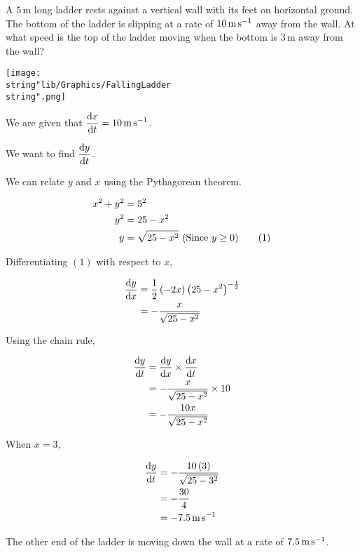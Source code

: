 \documentclass[11pt,a4paper]{book}
\begin{document}
\begin{example}

\begin{minipage}[t]{0.6\textwidth}

A $5\,\text{m}$ long ladder rests against a vertical wall with its
feet on horizontal ground. The bottom of the ladder is slipping at
a rate of $10\,\text{m\,s}^{-1}$ away from the wall. At what speed
is the top of the ladder moving when the bottom is $3\,\text{m}$
away from the wall?

\end{minipage}
\begin{minipage}[t]{0.4\textwidth}
\begin{center}
\texttt{[image: \\string"lib/Graphics/FallingLadder\\string".png]}
\par\end{center}

\end{minipage}

\Solution

We are given that ${\displaystyle \frac{{\rm d}x}{{\rm d}t}=10\,\text{m\,s}^{-1}}$.

We want to find ${\displaystyle \frac{{\rm d}y}{{\rm d}t}}$.

We can relate $y$ and $x$ using the Pythagorean theorem.

\begin{align*}
x^{2}+y^{2} & =5^{2}\\
y^{2} & =25-x^{2}\\
y & =\sqrt{25-x^{2}}\text{ (Since \ensuremath{y\geq0})}\tag{1}
\end{align*}

Differentiating $\left(1\right)$ with respect to $x$,

\begin{align*}
\frac{{\rm d}y}{{\rm d}x} & =\frac{1}{2}\left(-2x\right)\left(25-x^{2}\right)^{-\frac{1}{2}}\\
 & =-\frac{x}{\sqrt{25-x^{2}}}
\end{align*}

Using the chain rule,

\begin{align*}
\frac{{\rm d}y}{{\rm d}t} & =\frac{{\rm d}y}{{\rm d}x}\times\frac{{\rm d}x}{{\rm d}t}\\
 & =-\frac{x}{\sqrt{25-x^{2}}}\times10\\
 & =-\frac{10x}{\sqrt{25-x^{2}}}
\end{align*}

When $x=3$,

\begin{align*}
\frac{{\rm d}y}{{\rm d}t} & =-\frac{10\left(3\right)}{\sqrt{25-3^{2}}}\\
 & =-\frac{30}{4}\\
 & =-7.5\,\text{m\,s}^{-1}
\end{align*}

The other end of the ladder is moving down the wall at a rate of $7.5\,\text{m\,s}^{-1}$.

\end{example}
\end{document}
